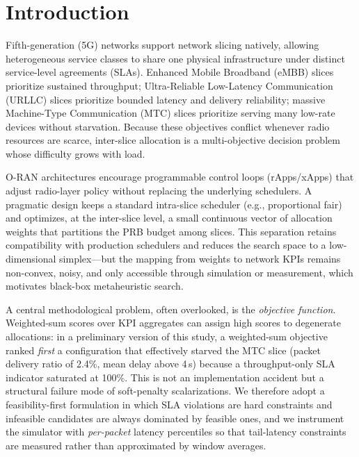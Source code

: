\documentclass[conference]{IEEEtran}
\begin{document}
\section{Introduction}
Fifth-generation (5G) networks support network slicing natively, allowing
heterogeneous service classes to share one physical infrastructure under
distinct service-level agreements (SLAs). Enhanced Mobile Broadband (eMBB)
slices prioritize sustained throughput; Ultra-Reliable Low-Latency
Communication (URLLC) slices prioritize bounded latency and delivery
reliability; massive Machine-Type Communication (MTC) slices prioritize
serving many low-rate devices without starvation. Because these objectives
conflict whenever radio resources are scarce, inter-slice allocation is a
multi-objective decision problem whose difficulty grows with load.

O-RAN architectures encourage programmable control loops (rApps/xApps) that
adjust radio-layer policy without replacing the underlying schedulers. A
pragmatic design keeps a standard intra-slice scheduler (e.g., proportional
fair) and optimizes, at the inter-slice level, a small continuous vector of
allocation weights that partitions the PRB budget among slices. This
separation retains compatibility with production schedulers and reduces the
search space to a low-dimensional simplex---but the mapping from weights to
network KPIs remains non-convex, noisy, and only accessible through simulation
or measurement, which motivates black-box metaheuristic search.

A central methodological problem, often overlooked, is the \emph{objective
function}. Weighted-sum scores over KPI aggregates can assign high scores to
degenerate allocations: in a preliminary version of this study, a weighted-sum
objective ranked \emph{first} a configuration that effectively starved the MTC
slice (packet delivery ratio of 2.4\%, mean delay above 4\,s) because a
throughput-only SLA indicator saturated at 100\%. This is not an implementation
accident but a structural failure mode of soft-penalty scalarizations. We
therefore adopt a feasibility-first formulation in which SLA violations are
hard constraints and infeasible candidates are always dominated by feasible
ones, and we instrument the simulator with \emph{per-packet} latency
percentiles so that tail-latency constraints are measured rather than
approximated by window averages.
\end{document}

